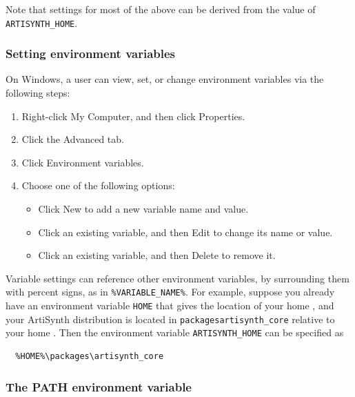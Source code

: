 
Note that settings for most of the above can be derived from the value
of {\tt ARTISYNTH\_HOME}.

\ifWindows
\subsubsection{Setting environment variables}
\label{settingWindowsVariables}

On Windows, a user can view, set, or change environment variables via
the following steps:

\begin{enumerate}

\item Right-click {\sf My Computer}, and then click {\sf Properties}.
\item Click the {\sf Advanced} tab.
\item Click {\sf Environment variables}.
\item Choose one of the following options:

\begin{itemize}

\item Click {\sf New} to add a new variable name and value.
\item Click an existing variable, and then {\sf Edit} to change its name or value.
\item Click an existing variable, and then {\sf Delete} to remove it.

\end{itemize}
\end{enumerate}

Variable settings can reference other environment variables, by
surrounding them with percent signs, as in {\tt \%VARIABLE\_NAME\%}.  For
example, suppose you already have an environment variable {\tt HOME} that
gives the location of your home \directory{}, and your ArtiSynth
distribution is located in {\tt packages\SEP artisynth\_core} relative to your
home \directory{}. Then the environment variable {\tt ARTISYNTH\_HOME} can be
specified as

\begin{verbatim}
  %HOME%\packages\artisynth_core
\end{verbatim}

\subsubsection{The PATH environment variable}
\label{settingWindowsPath}

